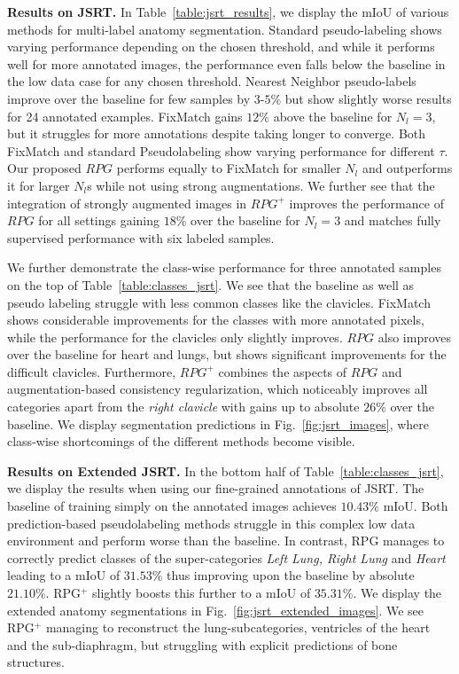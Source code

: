 \documentclass[letterpaper]{article} %
\begin{document}
\noindent\textbf{Results on JSRT.}
In Table~\ref{table:jsrt_results}, we display the mIoU of various methods for multi-label anatomy segmentation.
Standard pseudo-labeling shows varying performance depending on the chosen threshold, and while it performs well for more annotated images,  the performance even falls below the baseline in the low data case for any chosen threshold. Nearest Neighbor pseudo-labels improve over the baseline for few samples by $3$-$5\%$ but show slightly worse results for 24 annotated examples. FixMatch gains $12\%$ above the baseline for $N_l=3$, but it struggles for more annotations despite taking longer to converge. Both FixMatch and standard Pseudolabeling show varying performance for different $\tau$. Our proposed $RPG$ performs equally to FixMatch for smaller $N_l$ and outperforms it for larger $N_l$s while not using strong augmentations. We further see that the integration of strongly augmented images in $RPG^+$ improves the performance of $RPG$ for all settings gaining $18\%$ over the baseline for $N_l=3$ and matches fully supervised performance with six labeled samples.

We further demonstrate the class-wise performance for three annotated samples on the top of Table~\ref{table:classes_jsrt}. We see that the baseline as well as pseudo labeling struggle with less common classes like the clavicles. FixMatch shows considerable improvements for the classes with more annotated pixels, while the performance for the clavicles only slightly improves. $RPG$ also improves over the baseline for heart and lungs,
but shows significant improvements for the difficult clavicles. Furthermore, $RPG^+$ combines the aspects of $RPG$ and augmentation-based consistency regularization, which noticeably improves all categories apart from the \textit{right clavicle} with gains up to absolute $26\%$ over the baseline.
We display segmentation predictions in Fig.~\ref{fig:jsrt_images}, where class-wise shortcomings of the different methods become visible.


\noindent\textbf{Results on Extended JSRT.}
In the bottom half of Table~\ref{table:classes_jsrt}, we display the results when using our fine-grained annotations of JSRT. The baseline of training simply on the annotated images achieves $10.43\%$ mIoU. Both prediction-based pseudolabeling methods struggle in this complex low data environment and perform worse than the baseline. In contrast, RPG manages to correctly predict classes of the super-categories \textit{Left Lung, Right Lung} and \textit{Heart} leading to a mIoU of $31.53\%$ thus improving upon the baseline by absolute $21.10\%$. RPG$^+$ slightly boosts this further to a mIoU of $35.31\%$.
We display the extended anatomy segmentations in Fig.~\ref{fig:jsrt_extended_images}. We see RPG$^+$  managing to reconstruct the lung-subcategories, ventricles of the heart and the sub-diaphragm, but struggling with explicit predictions of bone structures.
\end{document}
